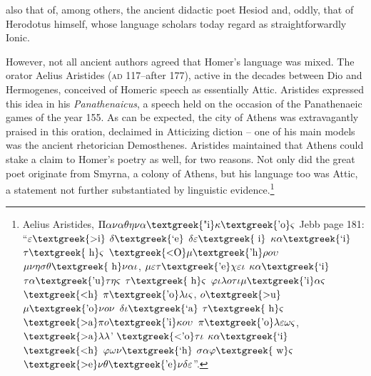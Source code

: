 also that of, among others, the ancient didactic poet Hesiod and, oddly, that of Herodotus himself, whose language scholars today regard as straightforwardly Ionic.

However, not all ancient authors agreed that Homer’s language was mixed. The orator Aelius Aristides (\textsc{ad} 117–after 177), active in the decades between Dio and Hermogenes, conceived of Homeric speech as essentially Attic. Aristides expressed this idea in his \textit{Panathenaicus}, a speech held on the occasion of the Panathenaeic games of the year 155. As can be expected, the city of Athens was extravagantly praised in this oration, declaimed in Atticizing diction – one of his main models was the ancient rhetorician Demosthenes. Aristides maintained that Athens could stake a claim to Homer’s poetry as well, for two reasons. Not only did the great poet originate from Smyrna, a colony of Athens, but his language too was Attic, a statement not further substantiated by linguistic evidence.\footnote{Aelius Aristides, $\Pi \alpha \nu \alpha \theta \eta \nu \alpha \text{\textgreek{"i}}\kappa \text{\textgreek{'o}}\varsigma $ Jebb page 181: “$\varepsilon \text{\textgreek{>i}}$ $\delta \text{\textgreek{`e}}$ $\delta \varepsilon \text{\textgreek{~i}}$ $\kappa \alpha \text{\textgreek{`i}}$ $\tau \text{\textgreek{~h}}\varsigma $ $\text{\textgreek{<O}}\mu \text{\textgreek{'h}}\rho o\upsilon $ $\mu \nu \eta \sigma \theta \text{\textgreek{~h}}\nu \alpha \iota $, $\mu \varepsilon \tau \text{\textgreek{'e}}\chi \varepsilon \iota $ $\kappa \alpha \text{\textgreek{`i}}$ $\tau \alpha \text{\textgreek{'u}}\tau \eta \varsigma $ $\tau \text{\textgreek{~h}}\varsigma $ $\varphi \iota \lambda o\tau \iota \mu \text{\textgreek{'i}}\alpha \varsigma $ $\text{\textgreek{<h}}$ $\pi \text{\textgreek{'o}}\lambda \iota \varsigma $, $o\text{\textgreek{>u}}$ $\mu \text{\textgreek{'o}}\nu o\nu $ $\delta \iota \text{\textgreek{`a}}$ $\tau \text{\textgreek{~h}}\varsigma $ $\text{\textgreek{>a}}\pi o\text{\textgreek{'i}}\kappa o\upsilon $ $\pi \text{\textgreek{'o}}\lambda \varepsilon \omega \varsigma $, $\text{\textgreek{>a}}\lambda \lambda $’ $\text{\textgreek{<'o}}\tau \iota $ $\kappa \alpha \text{\textgreek{`i}}$ $\text{\textgreek{<h}}$ $\varphi \omega \nu \text{\textgreek{`h}}$ $\sigma \alpha \varphi \text{\textgreek{~w}}\varsigma $ $\text{\textgreek{>e}}\nu \theta \text{\textgreek{'e}}\nu \delta \varepsilon $”.}

